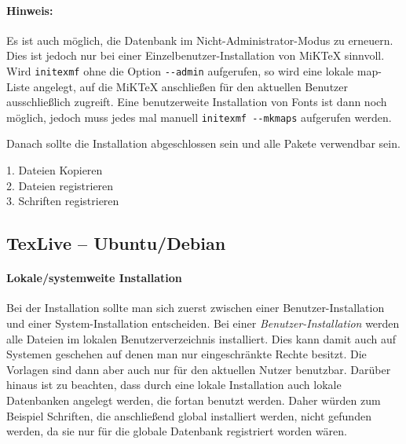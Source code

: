 \begin{description}
\begin{enumerate}
        \paragraph{Hinweis:} Es ist auch möglich, die Datenbank im 
          Nicht-Administrator-Modus zu erneu\-ern. Dies ist jedoch nur bei einer
          Einzelbenutzer-Installation von MiKTeX sinnvoll. Wird
          \lstinline{initexmf} ohne die Option \lstinline{--admin} aufgerufen,
          so wird eine lokale map-Liste angelegt, auf die MiKTeX anschließen für
          den aktuellen Benutzer ausschließlich zugreift.
          Eine benutzerweite Installation von Fonts ist dann noch 
          möglich, jedoch muss jedes mal manuell \lstinline{initexmf --mkmaps}
          aufgerufen werden.
    \end{enumerate}
    
    Danach sollte die Installation abgeschlossen sein und alle Pakete verwendbar 
    sein.
\end{description}
\begin{description}
  \item[1. Dateien Kopieren]
  \item[2. Dateien registrieren]
  \item[3. Schriften registrieren]
\end{description}


\subsection{TexLive -- Ubuntu/Debian}

\paragraph{Lokale/systemweite Installation}

Bei der Installation sollte man sich zuerst zwischen einer Benutzer-Installation
und einer System-Installation entscheiden.
Bei einer \emph{Benutzer-Installation} werden alle Dateien im lokalen Benutzerverzeichnis installiert.
Dies kann damit auch auf Systemen geschehen auf denen man nur
eingeschränkte Rechte besitzt.
Die Vorlagen sind dann aber auch nur für den aktuellen Nutzer benutzbar.
Darüber hinaus ist zu beachten, dass durch eine lokale Installation auch
lokale Datenbanken angelegt werden, die fortan benutzt werden.
Daher würden zum Beispiel Schriften, die anschließend global installiert werden,
nicht gefunden werden, da sie nur für die globale Datenbank registriert worden wären.

